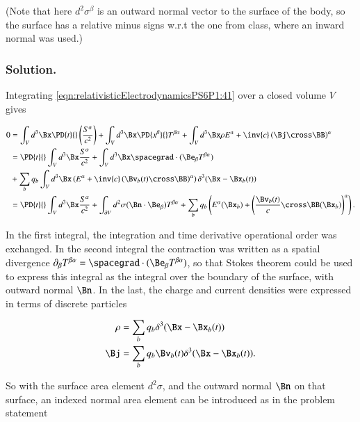 (Note that here $d^2 \sigma^\beta$ is an outward normal vector to the surface of the body, so the surface has a relative minus signs w.r.t the one from class, where an inward normal was used.)

\subsubsection{Solution.}

Integrating \ref{eqn:relativisticElectrodynamicsPS6P1:41} over a closed volume $V$ gives

\begin{align*}
0 
&=
\int_V d^3 \Bx \PD{t}{}\left( \frac{S^\alpha}{c^2} \right) 
+ 
\int_V d^3 \Bx \PD{x^\beta}{} T^{\beta \alpha} 
+
\int_V d^3 \Bx \rho E^\alpha + \inv{c} \left( \Bj \cross \BB \right)^\alpha  \\
&=
\PD{t}{} \int_V d^3 \Bx \frac{S^\alpha}{c^2} 
+ 
\int_V d^3 \Bx \spacegrad \cdot (\Be_\beta T^{\beta \alpha}) \\
&+
\sum_b q_b \int_V d^3 \Bx \left( E^\alpha + \inv{c} \left( \Bv_b(t) \cross \BB \right)^\alpha \right) \delta^3(\Bx - \Bx_b(t)) \\
&=
\PD{t}{} \int_V d^3 \Bx \frac{S^\alpha}{c^2} 
+ 
\int_{\partial V} d^2 \sigma (\Bn \cdot \Be_\beta) T^{\beta \alpha}
+
\sum_b q_b \left( E^\alpha(\Bx_b) + \left( \frac{\Bv_b(t)}{c} \cross \BB(\Bx_b) \right)^\alpha \right).
\end{align*}

In the first integral, the integration and time derivative operational order was exchanged.  In the second integral the contraction was written as a spatial divergence $\partial_\beta T^{\beta \alpha} = \spacegrad \cdot (\Be_\beta T^{\beta \alpha})$, so that Stokes theorem could be used to express this integral as the integral over the boundary of the surface, with outward normal $\Bn$.  In the last, the charge and current densities were expressed in terms of discrete particles

\begin{align}\label{eqn:relativisticElectrodynamicsPS6P1:230}
\rho &= \sum_b q_b \delta^3(\Bx - \Bx_b(t)) \\
\Bj &= \sum_b q_b \Bv_b(t) \delta^3(\Bx - \Bx_b(t)).
\end{align}

So with the surface area element $d^2 \sigma$, and the outward normal $\Bn$ on that surface, an indexed normal area element can be introduced as in the problem statement

